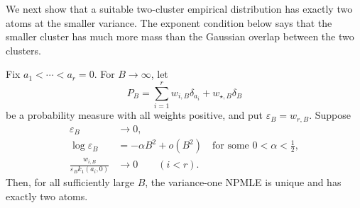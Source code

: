 We next show that a suitable two-cluster empirical distribution has exactly
two atoms at the smaller variance. The exponent condition below says that
the smaller cluster has much more mass than the Gaussian overlap between the
two clusters.
\begin{lemma}
\label{lem:nonmon-two-cluster}
Fix \(a_1<\cdots<a_r=0\). For \(B\to\infty\), let
\[
    P_B=\sum_{i=1}^r w_{i,B}\delta_{a_i}+w_{\star,B}\delta_B
\]
be a probability measure with all weights positive, and put
\(\varepsilon_B=w_{r,B}\). Suppose
\begin{align}
    \varepsilon_B&\to0,\label{eq:nonmon-eps-zero}\\
    \log\varepsilon_B
      &=-\alpha B^2+o(B^2)
        \quad\text{for some }0<\alpha<\frac12,\label{eq:nonmon-eps-rate}\\
    \frac{w_{i,B}}{\varepsilon_B k_1(a_i,0)}
      &\to0\qquad(i<r).\label{eq:nonmon-old-negligible}
\end{align}
Then, for all sufficiently large \(B\), the variance-one NPMLE is unique and
has exactly two atoms.
\end{lemma}

